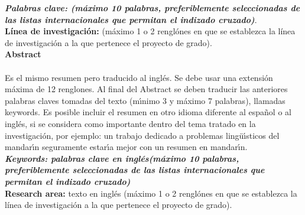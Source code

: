 \textbf{\small \textit{Palabras clave: (m\'{a}ximo 10 palabras, preferiblemente seleccionadas de las listas internacionales que permitan el indizado cruzado)}}.\\

\textbf{\small L\'inea de investigaci\'on:} \small (m\'aximo 1 o 2  rengl\'ones en que se establezca la  l\'inea de investigaci\'on a la que pertenece el proyecto de grado).\\


\newpage
\textbf{\LARGE Abstract}\\\\
Es el mismo resumen pero traducido al ingl\'{e}s. Se debe usar una extensi\'{o}n m\'{a}xima de 12 renglones. Al final del Abstract se deben traducir las anteriores palabras claves tomadas del texto (m\'{\i}nimo 3 y m\'{a}ximo 7 palabras), llamadas keywords. Es posible incluir el resumen en otro idioma diferente al espa\~{n}ol o al ingl\'{e}s, si se considera como importante dentro del tema tratado en la investigaci\'{o}n, por ejemplo: un trabajo dedicado a problemas ling\"{u}\'{\i}sticos del mandar\'{\i}n seguramente estar\'{\i}a mejor con un resumen en mandar\'{\i}n.\\[2.0cm]
\textbf{\small \textit {Keywords: palabras clave en ingl\'es(m\'aximo 10 palabras, preferiblemente seleccionadas de las listas internacionales que permitan el indizado cruzado)}}\\

\textbf{\small Research area:} \small texto en ingl\'es (m\'aximo 1 o 2
rengl\'ones en que se establezca la  l\'inea de investigaci\'on a la que
pertenece el proyecto de grado).\\
